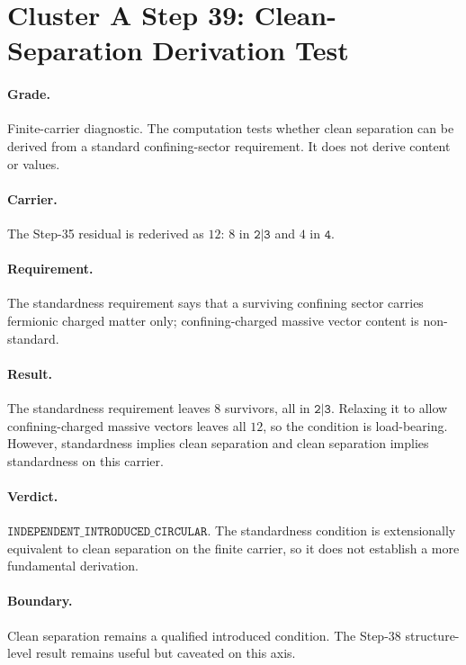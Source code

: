 \section*{Cluster A Step 39: Clean-Separation Derivation Test}

\paragraph{Grade.}
Finite-carrier diagnostic. The computation tests whether clean separation can be derived from a standard confining-sector requirement. It does not derive content or values.

\paragraph{Carrier.}
The Step-35 residual is rederived as \(12\): \(8\) in \(\texttt{2|3}\) and \(4\) in \(\texttt{4}\).

\paragraph{Requirement.}
The standardness requirement says that a surviving confining sector carries fermionic charged matter only; confining-charged massive vector content is non-standard.

\paragraph{Result.}
The standardness requirement leaves \(8\) survivors, all in \(\texttt{2|3}\). Relaxing it to allow confining-charged massive vectors leaves all \(12\), so the condition is load-bearing. However, standardness implies clean separation and clean separation implies standardness on this carrier.

\paragraph{Verdict.}
\(\texttt{INDEPENDENT\_INTRODUCED\_CIRCULAR}\). The standardness condition is extensionally equivalent to clean separation on the finite carrier, so it does not establish a more fundamental derivation.

\paragraph{Boundary.}
Clean separation remains a qualified introduced condition. The Step-38 structure-level result remains useful but caveated on this axis.
